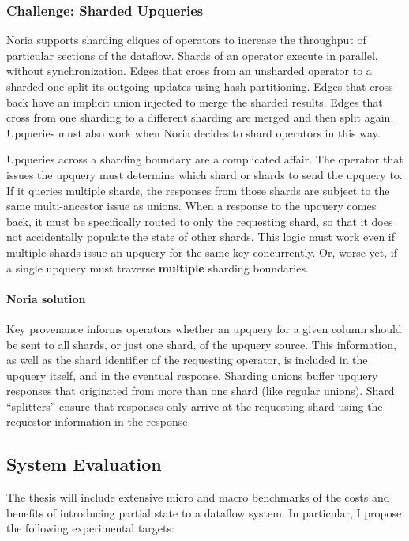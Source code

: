 \documentclass[fontsize=12pt,paper=letter]{scrartcl}
\begin{document}
\subsubsection{Challenge: Sharded Upqueries}

Noria supports sharding cliques of operators to increase the throughput
of particular sections of the dataflow. Shards of an operator execute in
parallel, without synchronization. Edges that cross from an unsharded
operator to a sharded one split its outgoing updates using hash
partitioning. Edges that cross back have an implicit union injected to
merge the sharded results. Edges that cross from one sharding to a
different sharding are merged and then split again. Upqueries must also
work when Noria decides to shard operators in this way.

Upqueries across a sharding boundary are a complicated affair. The
operator that issues the upquery must determine which shard or shards to
send the upquery to. If it queries multiple shards, the responses from
those shards are subject to the same multi-ancestor issue as unions.
When a response to the upquery comes back, it must be specifically
routed to only the requesting shard, so that it does not accidentally
populate the state of other shards. This logic must work even if
multiple shards issue an upquery for the same key concurrently. Or,
worse yet, if a single upquery must traverse \textbf{multiple} sharding
boundaries.

\paragraph{Noria solution}
Key provenance informs operators whether an upquery for a given column should be
sent to all shards, or just one shard, of the upquery source. This information,
as well as the shard identifier of the requesting operator, is included in the
upquery itself, and in the eventual response. Sharding unions buffer upquery
responses that originated from more than one shard (like regular unions). Shard
``splitters'' ensure that responses only arrive at the requesting shard using
the requestor information in the response.

\subsection{System Evaluation}
\label{s:eval}

The thesis will include extensive micro and macro benchmarks of the
costs and benefits of introducing partial state to a dataflow system. In
particular, I propose the following experimental targets:
\end{document}
